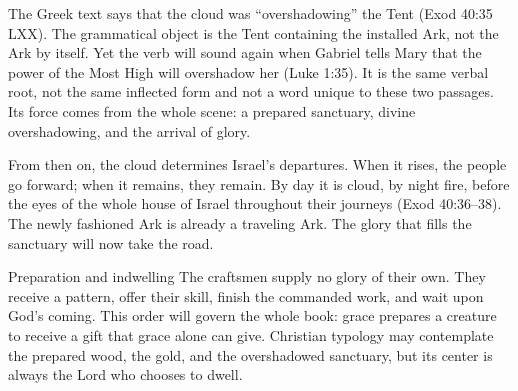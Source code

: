 The Greek text says that the cloud was ``overshadowing'' the Tent
(Exod 40:35 LXX).  The grammatical object is the Tent containing the installed
Ark, not the Ark by itself.  Yet the verb will sound again when Gabriel tells
Mary that the power of the Most High will overshadow her (Luke 1:35).  It is
the same verbal root, not the same inflected form and not a word unique to
these two passages.  Its force comes from the whole scene: a prepared
sanctuary, divine overshadowing, and the arrival of glory.

From then on, the cloud determines Israel's departures.  When it rises, the
people go forward; when it remains, they remain.  By day it is cloud, by night
fire, before the eyes of the whole house of Israel throughout their journeys
(Exod 40:36--38).  The newly fashioned Ark is already a traveling Ark.  The
glory that fills the sanctuary will now take the road.

\begin{studybox}{Preparation and indwelling}
The craftsmen supply no glory of their own.  They receive a pattern, offer
their skill, finish the commanded work, and wait upon God's coming.  This order
will govern the whole book: grace prepares a creature to receive a gift that
grace alone can give.  Christian typology may contemplate the prepared wood,
the gold, and the overshadowed sanctuary, but its center is always the Lord
who chooses to dwell.
\end{studybox}
